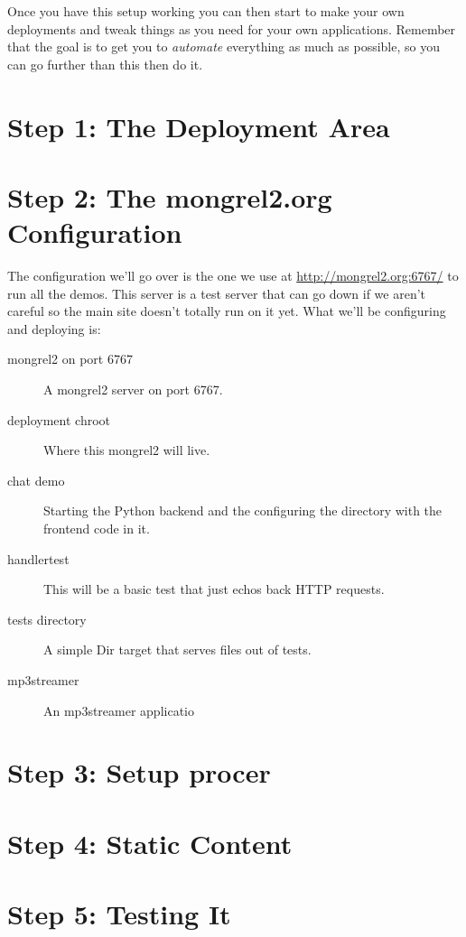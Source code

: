 Once you have this setup working you can then start to make your own
deployments and tweak things as you need for your own applications.  Remember
that the goal is to get you to \emph{automate} everything as much as possible,
so you can go further than this then do it.

\section{Step 1: The Deployment Area}

\section{Step 2: The mongrel2.org Configuration}

The configuration we'll go over is the one we use at \url{http://mongrel2.org:6767/}
to run all the demos.  This server is a test server that can go down if we aren't 
careful so the main site doesn't totally run on it yet.  What we'll be configuring
and deploying is:

\begin{description}
\item [mongrel2 on port 6767] A mongrel2 server on port 6767.
\item [deployment chroot] Where this mongrel2 will live.
\item [chat demo] Starting the Python backend and the configuring the directory with the
    frontend code in it.
\item [handlertest] This will be a basic test that just echos back HTTP requests.
\item [tests directory] A simple Dir target that serves files out of tests.
\item [mp3streamer] An mp3streamer applicatio
\end{description}


\section{Step 3: Setup procer}

\section{Step 4: Static Content}

\section{Step 5: Testing It}


